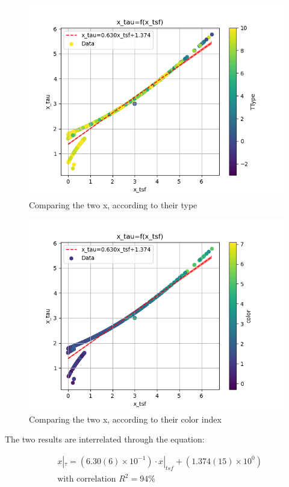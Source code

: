\documentclass[a4paper,twocolumn]{article}
\begin{document}
\begin{figure}[!htpb]
\centering
\includegraphics[width=.9\linewidth]{./figs/x_tsf-x_tau-color_TType.png}
\caption{\label{fig:Comparing the two x, according to their type}Comparing the two x, according to their type}
\end{figure}

\begin{figure}[!htpb]
\centering
\includegraphics[width=.9\linewidth]{./figs/x_tsf-x_tau-color_color.png}
\caption{\label{fig:Comparing the two x, according to their color index}Comparing the two x, according to their color index}
\end{figure}

The two results are interrelated through the equation:

\begin{equation}\label{eq:x_tsf-x_tau}
\begin{align}
& x|_\tau = (6.30(6) \times 10^{-1})\cdot x|_{tsf} + (1.374(15) \times 10^{0}) \\
& \textrm{with correlation } R^2=94\%
\end{align}
\end{equation}
\noindent
\end{document}
